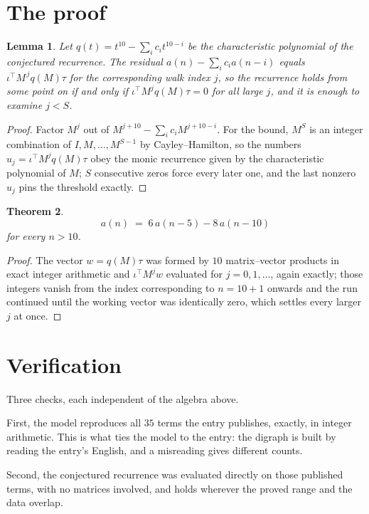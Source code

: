 \documentclass[11pt,a4paper]{article}
\theoremstyle{plain}
\newtheorem{theorem}{Theorem}
\newtheorem{lemma}[theorem]{Lemma}
\theoremstyle{definition}
\begin{document}
\section{The proof}

\begin{lemma}\label{lem:crit}
Let $q(t)=t^{10}-\sum_i c_it^{10-i}$ be the characteristic polynomial of the
conjectured recurrence. The residual $a(n)-\sum_ic_ia(n-i)$ equals
$\iota^{\!\top}M^{\,j}q(M)\tau$ for the corresponding walk index $j$, so the recurrence
holds from some point on if and only if $\iota^{\!\top}M^{j}q(M)\tau=0$ for all large $j$,
and it is enough to examine $j<S$.
\end{lemma}

\begin{proof}
Factor $M^{j}$ out of $M^{j+10}-\sum_ic_iM^{j+10-i}$. For the bound, $M^{S}$
is an integer combination of $I,M,\dots,M^{S-1}$ by Cayley--Hamilton, so the numbers
$u_j=\iota^{\!\top}M^{j}q(M)\tau$ obey the monic recurrence given by the characteristic
polynomial of $M$; $S$ consecutive zeros force every later one, and the last nonzero $u_j$
pins the threshold exactly.
\end{proof}

\begin{theorem}
\[
a(n)\;=\;6\,a(n-5) - 8\,a(n-10)
\]
for every $n>10$.
\end{theorem}

\begin{proof}
The vector $w=q(M)\tau$ was formed by $10$ matrix--vector products in exact integer
arithmetic and $\iota^{\!\top}M^{j}w$ evaluated for $j=0,1,\dots$, again exactly; those
integers vanish from the index corresponding to $n=10+1$ onwards and the run continued
until the working vector was identically zero, which settles every larger $j$ at once.
\end{proof}

\section{Verification}

Three checks, each independent of the algebra above.

First, the model reproduces all $35$ terms the entry publishes, exactly, in integer
arithmetic. This is what ties the model to the entry: the digraph is built by reading the
entry's English, and a misreading gives different counts.

Second, the conjectured recurrence was evaluated directly on those published terms, with no
matrices involved, and holds wherever the proved range and the data overlap.
\end{document}
